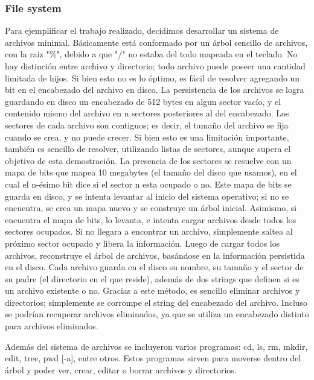 \documentclass[a4paper,10pt]{article}
\begin{document}
  \subsubsection{File system}
  Para ejemplificar el trabajo realizado, decidimos desarrollar un sistema de archivos minimal. Básicamente está conformado por un árbol sencillo de archivos, con la raiz "\%", debido a que "/" no estaba del todo mapeada en el teclado. No hay distinción entre archivo y directorio; todo archivo puede poseer una cantidad limitada de hijos. Si bien esto no es lo óptimo, es fácil de resolver agregando un bit en el encabezado del archivo en disco. La persistencia de los archivos se logra guardando en disco un encabezado de 512 bytes en algun sector vacío, y el contenido mismo del archivo en n sectores posteriores al del encabezado. Los sectores de cada archivo son contiguos; es decir, el tamaño del archivo se fija cuando se crea, y no puede crecer. Si bien esto es una limitación importante, también es sencillo de resolver, utilizando listas de sectores, aunque supera el objetivo de esta demostración. La presencia de los sectores se resuelve con un mapa de bits que mapea 10 megabytes (el tamaño del disco que usamos), en el cual el n-ésimo bit dice si el sector n esta ocupado o no. Este mapa de bits se guarda en disco, y se intenta levantar al inicio del sistema operativo; si no se encuentra, se crea un mapa nuevo y se construye un árbol inicial. Asimismo, si encuentra el mapa de bits, lo levanta, e intenta cargar archivos desde todos los sectores ocupados. Si no llegara a encontrar un archivo, simplemente saltea al próximo sector ocupado y libera la información. Luego de cargar todos los archivos, reconstruye el árbol de archivos, basándose en la información persistida en el disco. Cada archivo guarda en el disco su nombre, su tamaño y el sector de su padre (el directorio en el que reside), además de dos strings que definen si es un archivo existente o no. Gracias a este método, es sencillo eliminar archivos y directorios; simplemente se corrompe el string del encabezado del archivo. Incluso se podrían recuperar archivos eliminados, ya que se utiliza un encabezado distinto para archivos eliminados.\par
Además del sistema de archivos se incluyeron varios programas: cd, ls, rm, mkdir, edit, tree, pwd [-a], entre otros.
Estos programas sirven para moverse dentro del árbol y poder ver, crear, editar o borrar archivos y directorios. 

\newpage
\end{document}

